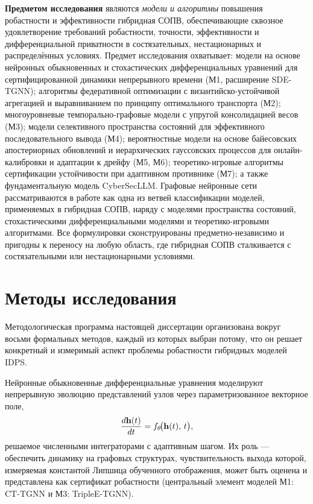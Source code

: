 \textbf{Предметом исследования} являются \emph{модели и алгоритмы} повышения робастности и эффективности гибридная СОПВ, обеспечивающие сквозное удовлетворение требований робастности, точности, эффективности и дифференциальной приватности в состязательных, нестационарных и распределённых условиях. Предмет исследования охватывает: модели на основе нейронных обыкновенных и стохастических дифференциальных уравнений для сертифицированной динамики непрерывного времени (М1, расширение SDE-TGNN); алгоритмы федеративной оптимизации с византийско-устойчивой агрегацией и выравниванием по принципу оптимального транспорта (М2); многоуровневые темпорально-графовые модели с упругой консолидацией весов (М3); модели селективного пространства состояний для эффективного последовательного вывода (М4); вероятностные модели на основе байесовских апостериорных обновлений и иерархических гауссовских процессов для онлайн-калибровки и адаптации к дрейфу (М5, М6); теоретико-игровые алгоритмы сертификации устойчивости при адаптивном противнике (М7); а также фундаментальную модель CyberSecLLM. Графовые нейронные сети рассматриваются в работе как одна из ветвей классификации моделей, применяемых в гибридная СОПВ, наряду с моделями пространства состояний, стохастическими дифференциальными моделями и теоретико-игровыми алгоритмами. Все формулировки сконструированы предметно-независимо и пригодны к переносу на любую область, где гибридная СОПВ сталкивается с состязательными или нестационарными условиями.

\section*{Методы исследования}

Методологическая программа настоящей диссертации организована вокруг восьми формальных методов, каждый из которых выбран потому, что он решает конкретный и измеримый аспект проблемы робастности гибридных моделей IDPS.

Нейронные обыкновенные дифференциальные уравнения моделируют непрерывную эволюцию представлений узлов через параметризованное векторное поле,
\begin{equation}
\frac{d\mathbf{h}(t)}{dt} = f_\theta\!\bigl(\mathbf{h}(t),\, t\bigr),
\label{eq:node}
\end{equation}
решаемое численными интеграторами с адаптивным шагом. Их роль --- обеспечить динамику на графовых структурах, чувствительность выхода которой, измеряемая константой Липшица обученного отображения, может быть оценена и представлена как сертификат робастности (центральный элемент моделей М1: CT-TGNN и М3: TripleE-TGNN).

